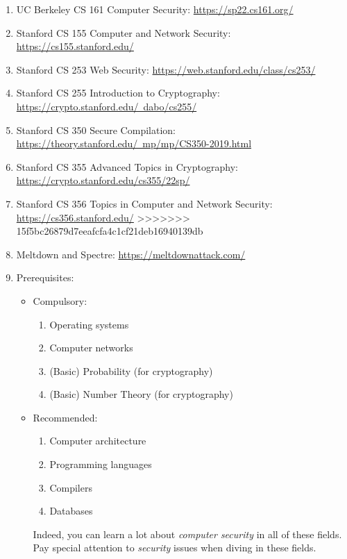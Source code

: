 \documentclass{article}
\begin{document}
\begin{enumerate}
=======
    \item UC Berkeley CS 161 Computer Security:
    \href{https://sp22.cs161.org/}{https://sp22.cs161.org/}
    \item Stanford CS 155 Computer and Network Security:
    \href{https://cs155.stanford.edu/}{https://cs155.stanford.edu/}
    \item Stanford CS 253 Web Security:
    \href{https://web.stanford.edu/class/cs253/}{https://web.stanford.edu/class/cs253/}
    \item Stanford CS 255 Introduction to Cryptography:
    \href{https://crypto.stanford.edu/~dabo/cs255/}{https://crypto.stanford.edu/~dabo/cs255/}
    \item Stanford CS 350 Secure Compilation:\\
    \href{https://theory.stanford.edu/~mp/mp/CS350-2019.html}{https://theory.stanford.edu/~mp/mp/CS350-2019.html}
    \item Stanford CS 355 Advanced Topics in Cryptography:\\
    \href{https://crypto.stanford.edu/cs355/22sp/}{https://crypto.stanford.edu/cs355/22sp/}
    \item Stanford CS 356 Topics in Computer and Network Security:
    \href{https://cs356.stanford.edu/}{https://cs356.stanford.edu/}
>>>>>>> 15f5bc26879d7eeafcfa4c1cf21deb16940139db
    \item Meltdown and Spectre:
    \href{https://meltdownattack.com/}{https://meltdownattack.com/}
    \item Prerequisites:
    \begin{itemize}
        \item Compulsory:
        \begin{enumerate}
            \item Operating systems
            \item Computer networks
            \item (Basic) Probability (for cryptography)
            \item (Basic) Number Theory (for cryptography)
        \end{enumerate}
        \item Recommended:
        \begin{enumerate}
            \item Computer architecture
            \item Programming languages
            \item Compilers
            \item Databases
        \end{enumerate}
        Indeed, you can learn a lot about \emph{computer security} in all of these fields.
        Pay special attention to \emph{security} issues when diving in these fields.
    \end{itemize}
\end{enumerate}
\end{document}
